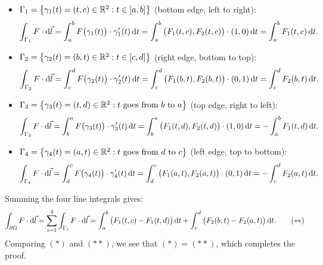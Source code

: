 \begin{demonstration}
\begin{center}
\end{center}
\begin{itemize}
    \item $\Gamma_1 = \left\{\gamma_1(t) = (t, c) \in \mathbb{R}^2 : t \in [a, b]\right\}$ (bottom edge, left to right):
    \[
        \int_{\Gamma_1} F \cdot \mathrm{d}\vec{l} = \int_{a}^{b} F\big(\gamma_1(t)\big) \cdot \gamma_1'(t) \,\mathrm{d}t = \int_{a}^{b} \big(F_1(t,c), F_2(t,c)\big) \cdot (1, 0) \,\mathrm{d}t = \int_{a}^{b} F_1(t,c) \,\mathrm{d}t.
    \]
    \item $\Gamma_2 = \left\{\gamma_2(t) = (b, t) \in \mathbb{R}^2 : t \in [c, d]\right\}$ (right edge, bottom to top):
    \[
        \int_{\Gamma_2} F \cdot \mathrm{d}\vec{l} = \int_{c}^{d} F\big(\gamma_2(t)\big) \cdot \gamma_2'(t) \,\mathrm{d}t = \int_{c}^{d} \big(F_1(b,t), F_2(b,t)\big) \cdot (0, 1) \,\mathrm{d}t = \int_{c}^{d} F_2(b,t) \,\mathrm{d}t.
    \]
    \item $\Gamma_3 = \left\{\gamma_3(t) = (t, d) \in \mathbb{R}^2 : t \text{ goes from } b \text{ to } a\right\}$ (top edge, right to left):
    \[
        \int_{\Gamma_3} F \cdot \mathrm{d}\vec{l} = \int_{b}^{a} F\big(\gamma_3(t)\big) \cdot \gamma_3'(t) \,\mathrm{d}t = \int_{b}^{a} \big(F_1(t,d), F_2(t,d)\big) \cdot (1, 0) \,\mathrm{d}t = -\int_{a}^{b} F_1(t,d) \,\mathrm{d}t.
    \]
    \item $\Gamma_4 = \left\{\gamma_4(t) = (a, t) \in \mathbb{R}^2 : t \text{ goes from } d \text{ to } c\right\}$ (left edge, top to bottom):
    \[
        \int_{\Gamma_4} F \cdot \mathrm{d}\vec{l} = \int_{d}^{c} F\big(\gamma_4(t)\big) \cdot \gamma_4'(t) \,\mathrm{d}t = \int_{d}^{c} \big(F_1(a,t), F_2(a,t)\big) \cdot (0, 1) \,\mathrm{d}t = -\int_{c}^{d} F_2(a,t) \,\mathrm{d}t.
    \]
\end{itemize}
Summing the four line integrals gives:
\begin{equation}
    \int_{\partial\Omega} F \cdot \mathrm{d}\vec{l} = \sum_{i=1}^{4} \int_{\Gamma_i} F \cdot \mathrm{d}\vec{l} = \int_{a}^{b} \big( F_1(t,c) - F_1(t,d) \big) \,\mathrm{d}t + \int_{c}^{d} \big( F_2(b,t) - F_2(a,t) \big) \,\mathrm{d}t. \tag{$**$}
\end{equation}
Comparing $(*)$ and $(**)$, we see that $(*) = (**)$, which completes the proof.
\end{demonstration}

